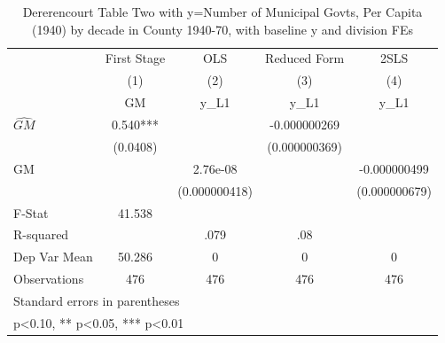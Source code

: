 \begin{table}[htbp]\centering
\def\sym#1{\ifmmode^{#1}\else\(^{#1}\)\fi}
\caption{Dererencourt Table Two with y=Number of Municipal Govts, Per Capita (1940) by decade in County 1940-70, with baseline y and division FEs}
\begin{tabular}{l*{4}{c}}
\toprule
                    & First Stage   &         OLS   &Reduced Form   &        2SLS   \\
                    &\multicolumn{1}{c}{(1)}&\multicolumn{1}{c}{(2)}&\multicolumn{1}{c}{(3)}&\multicolumn{1}{c}{(4)}\\
                    &\multicolumn{1}{c}{GM}&\multicolumn{1}{c}{y\_L1}&\multicolumn{1}{c}{y\_L1}&\multicolumn{1}{c}{y\_L1}\\
\midrule
$\hat{GM}$          &       0.540***&               &-0.000000269   &               \\
                    &    (0.0408)   &               &(0.000000369)   &               \\
\addlinespace
GM                  &               &    2.76e-08   &               &-0.000000499   \\
                    &               &(0.000000418)   &               &(0.000000679)   \\
\midrule
F-Stat              &      41.538   &               &               &               \\
R-squared           &               &        .079   &         .08   &               \\
Dep Var Mean        &      50.286   &           0   &           0   &           0   \\
Observations        &         476   &         476   &         476   &         476   \\
\bottomrule
\multicolumn{5}{l}{\footnotesize Standard errors in parentheses}\\
\multicolumn{5}{l}{\footnotesize * p<0.10, ** p<0.05, *** p<0.01}\\
\end{tabular}
\end{table}
